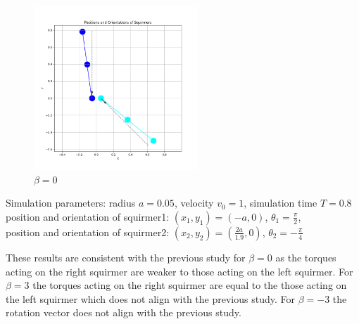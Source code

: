 \documentclass{article}
\begin{document}
\begin{figure}[H]
\begin{minipage}{0.49\textwidth}
        \caption{\footnotesize $\beta = 3$}
    \end{minipage}
    \includegraphics[width=0.55\textwidth]{graphs/simulations/sim_sq_sq/beta0/mpi_4_.png}
    \caption{\footnotesize $\beta = 0$}
\end{figure}
\begin{center}
    Simulation parameters: radius $a=0.05$, velocity $v_0=1$, simulation time $T=0.8$\\
        position and orientation of squirmer1: $(x_1,y_1)=(-a,0)$, $\theta_1=\frac{\pi}{2}$,\\
        position and orientation of squirmer2: $(x_2,y_2)=(\frac{2a}{1.9},0)$, $\theta_2=-\frac{\pi}{4}$
\end{center}
These results are consistent with the previous study\cite{Stark} for $\beta = 0$ as the torques acting on the right 
squirmer are weaker to those acting on the left squirmer. For $\beta = 3$ the torques acting on the right squirmer are
equal to the those acting on the left squirmer which does not align with the previous study.
For $\beta = -3$ the rotation vector does not align with the previous study.
\\
\\
\end{document}
